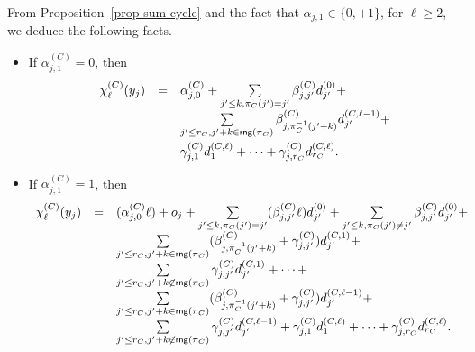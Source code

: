 \documentclass[runningheads,a4paper]{llncs}
\newcommand\rng{\mathsf{rng}}
\newcommand{\hide}[1]{}
\begin{document}
From Proposition~\ref{prop-sum-cycle} and the fact that $\alpha_{j,1} \in \{0,+1\}$, for $\ell \ge 2$, we deduce the following facts.
\begin{itemize}
\item If $\alpha^{(C)}_{j,1}=0$, then
\[
\begin{array}{l c l}
\chi^{(C)}_{\ell}(y_j)  & = & \alpha^{(C)}_{j,0} +  \sum \limits_{j' \le k, \pi_C(j')=j'} \beta^{(C)}_{j,j'} d^{(0)}_{j'} +
\\
\smallskip
& & \sum \limits_{j' \le r_C, j'+k \in \rng(\pi_C)} \beta^{(C)}_{j, \pi_C^{-1}(j'+k)} d^{(C,\ell-1)}_{j'} + \\
& & \gamma^{(C)}_{j, 1} d^{(C,\ell)}_{1} + \dots + \gamma^{(C)}_{j,r_C} d^{(C,\ell)}_{r_C}.
\end{array} 
\]
\item If $\alpha^{(C)}_{j,1}=1$, then 
\[
\begin{array}{l c l}
\chi^{(C)}_{\ell}(y_j)  & = & (\alpha^{(C)}_{j,0} \ell) + o_j +   \sum \limits_{j' \le k, \pi_C(j')=j'} (\beta^{(C)}_{j,j'} \ell) d^{(0)}_{j'} + \sum \limits_{j'\le k, \pi_C(j') \neq j'} \beta^{(C)}_{j,j'} d^{(0)}_{j'} +  \\
%
& & \sum \limits_{j' \le r_C, j'+k \in \rng(\pi_C)} (\beta^{(C)}_{j, \pi_C^{-1}(j'+k)} + \gamma^{(C)}_{j,j'}) d^{(C,1)}_{j'} + \\
%
& & \sum \limits_{j' \le r_C,  j'+k \not \in \rng(\pi_C)} \gamma^{(C)}_{j,j'} d^{(C,1)}_{j'} + \dots + \\
%
& & \sum \limits_{j' \le r_C, j'+k \in \rng(\pi_C)} (\beta^{(C)}_{j, \pi_C^{-1}(j'+k)}+\gamma^{(C)}_{j,j'}) d^{(C,\ell-1)}_{j'} + \\
%
& & \sum \limits_{j' \le r_C,  j'+k \not \in \rng(\pi_C)} \gamma^{(C)}_{j,j'} d^{(C,\ell-1)}_{j'} + \gamma^{(C)}_{j, 1} d^{(C,\ell)}_{1} + \dots + \gamma^{(C)}_{j,r_C} d^{(C,\ell)}_{r_C}.
\end{array} 
\]
%
\hide{
\item If $\alpha^{(C)}_{j,1}=-1$ and $\ell$ is even, then
\[
\begin{array}{l c l}
\chi^{(C)}_{\ell}(y_j)  & = &  o_j + \sum \limits_{j'\le k, \pi_C(j') \neq j'} (-\beta^{(C)}_{j,j'}) d^{(0)}_{j'} +  \\
%
& & \sum \limits_{j' \le r_C, j'+k \in \rng(\pi_C)} ( \beta^{(C)}_{j, \pi_C^{-1}(j'+k)} - \gamma^{(C)}_{j,j'}) d^{(C,1)}_{j'} + \\
%
& & \sum \limits_{j' \le r_C,  j'+k \not \in \rng(\pi_C)} (-\gamma^{(C)}_{j,j'}) d^{(C,1)}_{j'} + \dots + \\

\end{array}\]}
\end{itemize}
\end{document}
